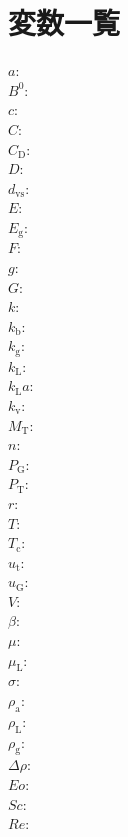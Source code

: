 \documentclass[a4j]{jsreport}
\begin{document}
\chapter*{変数一覧}
\begin{multicols}{2}
\begin{flushleft}
    $a$: \\
    $B^0$:\\
    $c$:\\
    $C$:\\
    $C_{\mathrm{D}}$:\\
    $D$:\\
    $d_{\mathrm{vs}}$:\\
    $E$:\\
    $E_{\mathrm{g}}$:\\
    $F$:\\
    $g$:\\
    $G$:\\
    $k$:\\
    $k_{\mathrm{b}}$:\\
    $k_{\mathrm{g}}$:\\
    $k_{\mathrm{L}}$:\\
    $k_{\mathrm{L}}a$:\\
    $k_{\mathrm{v}}$:\\
    $M_{\mathrm{T}}$:\\
    $n$:\\
    $P_{\mathrm{G}}$:\\
    $P_{\mathrm{T}}$:\text{}\\
    $r$:\\
    $T$:\\
    $T_{\mathrm{c}}$:\\
    $u_{\mathrm{t}}$:\\
    $u_{\mathrm{G}}$:\\
    $V$:\\
    $\beta$:\\
    $\mu$:\\
    $\mu_{\mathrm{L}}$:\\
    $\sigma$:\\
    $\rho_{\mathrm{a}}$:\\
    $\rho_{\mathrm{L}}$:\\
    $\rho_{\mathrm{g}}$:\\
    $\Delta\rho$:\\
    $Eo$:\\
    $Sc$:\\
    $Re$:
\end{flushleft}
\end{multicols}
\end{document}

